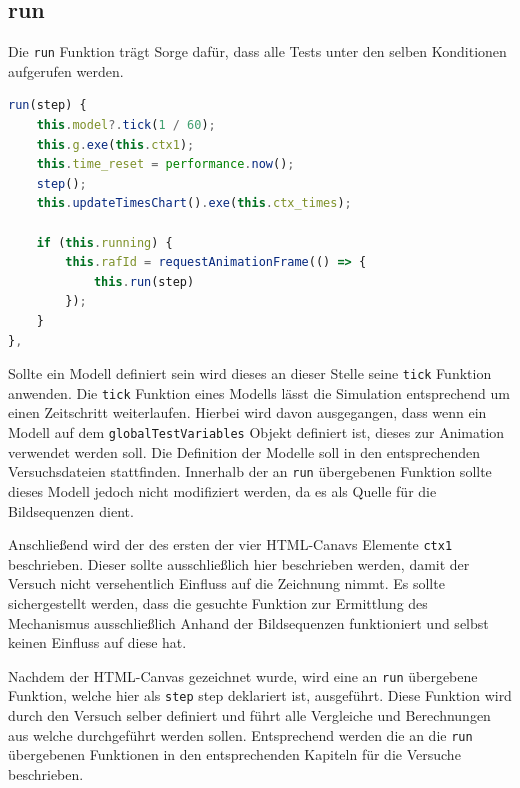 \subsection{run}\label{ch:gtv_run}

Die \lstinline{run} Funktion trägt Sorge dafür, dass alle Tests unter den selben Konditionen aufgerufen werden.

\begin{lstlisting}[language=JavaScript, caption={Definition der \lstinline{globalTestVariables.run} Funktion.}, label={lst:gtv_run}]
run(step) {
    this.model?.tick(1 / 60);
    this.g.exe(this.ctx1);
    this.time_reset = performance.now();
    step();
    this.updateTimesChart().exe(this.ctx_times);

    if (this.running) {
        this.rafId = requestAnimationFrame(() => {
            this.run(step)
        });
    }
},
\end{lstlisting}

Sollte ein  Modell definiert sein wird dieses an dieser Stelle seine \lstinline{tick} Funktion anwenden.
Die \lstinline{tick} Funktion eines  Modells lässt die Simulation entsprechend um einen Zeitschritt weiterlaufen.
Hierbei wird davon ausgegangen, dass wenn ein  Modell auf dem \lstinline{globalTestVariables} Objekt definiert ist, dieses zur Animation verwendet werden soll.
Die Definition der Modelle soll in den entsprechenden Versuchsdateien stattfinden.
Innerhalb der an \lstinline{run} übergebenen Funktion sollte dieses Modell jedoch nicht modifiziert werden, da es als Quelle für die Bildsequenzen dient.

Anschlie{\ss}end wird der  des ersten der vier HTML-Canavs Elemente \lstinline{ctx1} beschrieben.
Dieser sollte ausschlie{\ss}lich hier beschrieben werden, damit der Versuch nicht versehentlich Einfluss auf die Zeichnung nimmt.
Es sollte sichergestellt werden, dass die gesuchte Funktion zur Ermittlung des Mechanismus ausschlie{\ss}lich Anhand der Bildsequenzen funktioniert und selbst keinen Einfluss auf diese hat.

Nachdem der HTML-Canvas gezeichnet wurde, wird eine an \lstinline{run} übergebene Funktion, welche hier als \lstinline{step} step deklariert ist, ausgeführt.
Diese Funktion wird durch den Versuch selber definiert und führt alle Vergleiche und Berechnungen aus welche durchgeführt werden sollen.
Entsprechend werden die an die \lstinline{run} übergebenen Funktionen in den entsprechenden Kapiteln für die Versuche beschrieben.

